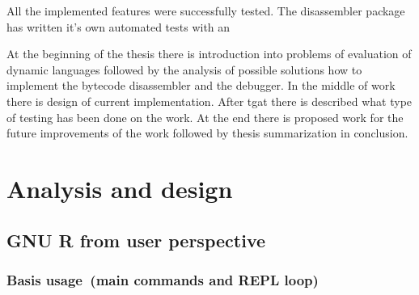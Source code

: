 \documentclass[thesis=M,english]{FITthesis}[2018/10/20]
\begin{document}
All the implemented features were successfully tested. The disassembler package has written it's own automated tests with an

At the beginning of the thesis there is introduction into problems of evaluation of dynamic languages followed by the analysis of possible solutions how to implement the bytecode disassembler and the debugger. In the middle of work there is design of current implementation. After tgat there is described what type of testing has been done on the work. At the end there is proposed work for the future improvements of the work followed by thesis summarization in conclusion.





\chapter{Analysis and design}

\section{GNU R from user perspective}\label{R-UI}

\subsection{Basis usage~(main commands and REPL loop)}\label{REPL}
\end{document}

